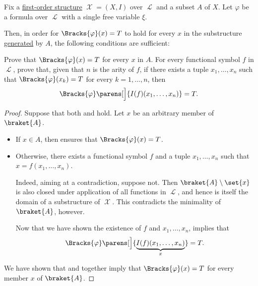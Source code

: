 \begin{theorem}\label{thm:induction_on_generated_substructures}
  Fix a \hyperref[def:first_order_structure]{first-order structure} \( \mscrX = (X, I) \) over \( \mscrL \) and a subset \( A \) of \( X \). Let \( \varphi \) be a formula over \( \mscrL \) with a single free variable \( \xi \).

  Then, in order for \( \Bracks{\varphi}(x) = T \) to hold for every \( x \) in the substructure \hyperref[def:first_order_generated_substructure]{generated} by \( A \), the following conditions are sufficient:
  \begin{thmenum}
     Prove that \( \Bracks{\varphi}(x) = T \) for every \( x \) in \( A \).
     For every functional symbol \( f \) in \( \mscrL \), prove that, given that \( n \) is the arity of \( f \), if there exists a tuple \( x_1, \ldots, x_n \) such that \( \Bracks{\varphi}(x_k) = T \) for every \( k = 1, \ldots, n \), then
    \begin{equation*}
      \Bracks{\varphi}\parens[\Big]{ I(f)(x_1, \ldots, x_n) } = T.
    \end{equation*}
  \end{thmenum}
\end{theorem}
\begin{proof}
  Suppose that both  and  hold. Let \( x \) be an arbitrary member of \( \braket{ A } \).

  \begin{itemize}
    \item If \( x \in A \), then  ensures that \( \Bracks{\varphi}(x) = T \).
    \item Otherwise, there exists a functional symbol \( f \) and a tuple \( x_1, \ldots, x_n \) such that \( x = f(x_1, \ldots, x_n) \).

    Indeed, aiming at a contradiction, suppose not. Then \( \braket{ A } \setminus \set{ x } \) is also closed under application of all functions in \( \mscrL \), and hence is itself the domain of a substructure of \( \mscrX \). This contradicts the minimality of \( \braket{ A } \), however.

    Now that we have shown the existence of \( f \) and \( x_1, \ldots, x_n \),  implies that
    \begin{equation*}
      \Bracks{\varphi}\parens[\Big]{ \underbrace{ I(f)(x_1, \ldots, x_n) }_{x} } = T.
    \end{equation*}
  \end{itemize}

  We have shown that  and  together imply that \( \Bracks{\varphi}(x) = T \) for every member \( x \) of \( \braket{ A } \).
\end{proof}

